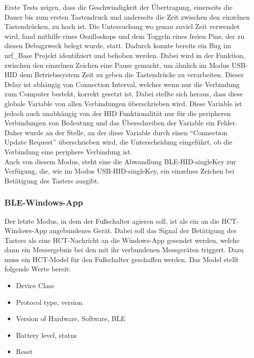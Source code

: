 Erste Tests zeigen, dass die Geschwindigkeit der Übertragung, einerseits die Dauer bis zum ersten Tastendruck und anderseits die Zeit zwischen den einzelnen Tastendrücken, zu hoch ist. Die Untersuchung wo genau zuviel Zeit verwendet wird, fand mithilfe eines Oszilloskops und dem Toggeln eines freien Pins, der zu diesen Debugzweck belegt wurde, statt. Dadurch konnte bereits ein Bug im nrf\_Base Projekt identifziert und behoben werden. Dabei wird in der Funktion, zwischen den einzelnen Zeichen eine Pause gemacht, um ähnlich im Modus USB-\ac{HID} dem Betriebssystem Zeit zu geben die Tastendrücke zu verarbeiten. Dieser Delay ist abhängig von Connection Interval, welches wenn nur die Verbindung zum Computer besteht, korrekt gesetzt ist. Dabei stellte sich heraus, dass diese globale Variable von allen Verbindungen überschrieben wird. Diese Variable ist jedoch auch unabhängig von der \ac{HID} Funktionalität nur für die peripheren Verbindungen von Bedeutung und das Überschreiben der Variable ein Fehler. Daher wurde an der Stelle, an der diese Variable durch einen ``Connection Update Request'' überschrieben wird, die Unterscheidung eingeführt, ob die Verbindung eine periphere Verbindung ist.\\
Auch von diesem Modus, steht eine die Abwandlung \ac{BLE}-\ac{HID}-singleKey zur Verfügung, die, wie im Modus USB-\ac{HID}-singleKey, ein einzelnes Zeichen bei Betätigung des Tasters ausgibt.


\subsubsection{BLE-Windows-App}
Der letzte Modus, in dem der Fußschalter agieren soll, ist als ein an die \ac{HCT}-Windows-App angebundenes Gerät. Dabei soll das Signal der Betätigung des Tasters als eine \ac{HCT}-Nachricht an die Windows-App gesendet werden, welche dann ein Messergebnis bei den mit ihr verbundenen Messgeräten triggert. Dazu muss ein \ac{HCT}-Model für den Fußschalter geschaffen werden. Das Model stellt folgende Werte bereit:
\begin{itemize}
	\item Device Class
	\item Protocol type, version 
	\item Version of Hardware, Software, \ac{BLE}
	\item Battery level, status
	\item Reset 
\end{itemize}

